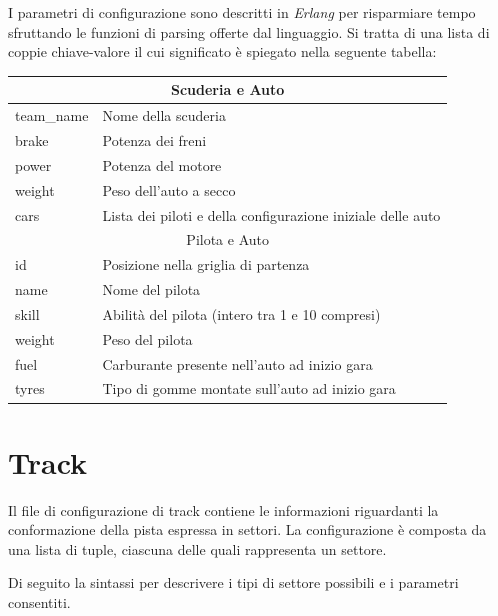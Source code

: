 \documentclass[11pt,a4paper]{report}
\begin{document}
I parametri di configurazione sono descritti in \textit{Erlang} per risparmiare tempo sfruttando le funzioni di parsing offerte dal linguaggio. Si tratta di una lista di coppie chiave-valore il cui significato è spiegato nella seguente tabella:

\begin{center}
\begin{tabular}{|p{}|p{}|}
\hline
\multicolumn{2}{|c|}{Scuderia e Auto}\\
\hline
team\_name & Nome della scuderia\\
brake & Potenza dei freni\\
power & Potenza del motore\\
weight & Peso dell'auto a secco\\
cars & Lista dei piloti e della configurazione iniziale delle auto\\
\hline
\multicolumn{2}{|c|}{Pilota e Auto}\\
\hline
id & Posizione nella griglia di partenza\\
name & Nome del pilota\\
skill & Abilità del pilota (intero tra 1 e 10 compresi)\\
weight & Peso del pilota\\
fuel & Carburante presente nell'auto ad inizio gara\\
tyres & Tipo di gomme montate sull'auto ad inizio gara\\
\hline
\end{tabular}
\end{center}

\section*{Track}
Il file di configurazione di track contiene le informazioni riguardanti la conformazione della pista espressa in settori. La configurazione è composta da una lista di tuple, ciascuna delle quali rappresenta un settore.

Di seguito la sintassi per descrivere i tipi di settore possibili e i parametri consentiti.
\end{document}
